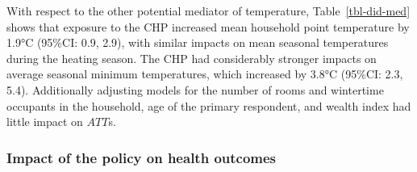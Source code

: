 \documentclass[
  letterpaper,
  DIV=11,
  numbers=noendperiod]{scrartcl}
\begin{document}
With respect  to the other potential mediator of
temperature, Table~\ref{tbl-did-med} shows that exposure to the CHP
increased mean household point temperature by 1.9°C (95\%CI: 0.9, 2.9),
with similar impacts on mean seasonal temperatures during the heating
season. The CHP had considerably stronger impacts on average seasonal
minimum temperatures, which increased by 3.8°C (95\%CI: 2.3, 5.4).
Additionally adjusting models for the number of rooms and wintertime
occupants in the household, age of the primary respondent, and wealth
index had little impact on \(ATT\)s.

\subsubsection{Impact of the policy on health
outcomes}\label{impact-of-the-policy-on-health-outcomes}
\end{document}
